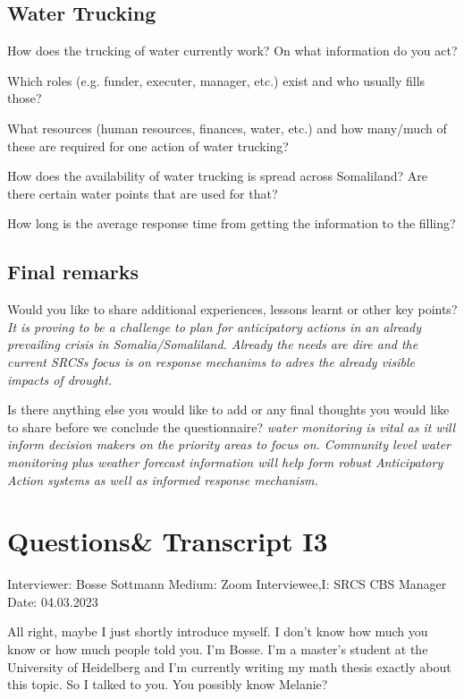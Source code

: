\subsection*{Water Trucking}

How does the trucking of water currently work? On what information do you act?

Which roles (e.g. funder, executer, manager, etc.) exist and who usually fills those?

What resources (human resources, finances, water, etc.) and how many/much of these are required for one action of water trucking?

How does the availability of water trucking is spread across Somaliland? Are there certain water points that are used for that?

How long is the average response time from getting the information to the filling?

\subsection*{Final remarks}
Would you like to share additional experiences, lessons learnt or other key points?\newline
\textit{It is proving to be a challenge to plan for anticipatory actions in an already prevailing crisis in Somalia/Somaliland. Already the needs are dire and the current SRCSs focus is on response mechanims to adres the already visible impacts of drought.}

Is there anything else you would like to add or any final thoughts you would like to share before we conclude the questionnaire?
\textit{water monitoring is vital as it will inform decision makers on the priority areas to focus on. Community level water monitoring plus weather forecast information will help form robust Anticipatory Action systems as well as informed response mechanism.}


\section{Questions\& Transcript I3}
Interviewer: Bosse Sottmann\newline
Medium: Zoom\newline
Interviewee,I: SRCS CBS Manager \newline
Date: 04.03.2023\newline

All right, maybe I just shortly introduce myself. I don't know how much you know or how much people told you. I'm Bosse. I'm a master's student at the University of Heidelberg and I'm currently writing my math thesis exactly about this topic. So I talked to you. You possibly know Melanie? 

